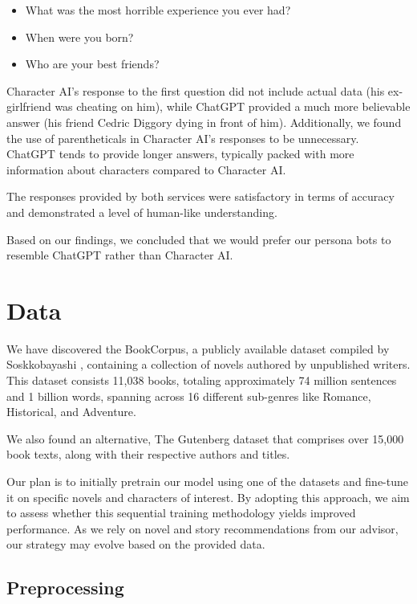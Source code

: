 \documentclass[fleqn,moreauthors,10pt]{ds_report}
\begin{document}
\begin{itemize}
    \item What was the most horrible experience you ever had?
    \item When were you born?
    \item Who are your best friends?
\end{itemize}

Character AI's response to the first question did not include actual data (his ex-girlfriend was cheating on him), while ChatGPT provided a much more believable answer (his friend Cedric Diggory dying in front of him). Additionally, we found the use of parentheticals in Character AI's responses to be unnecessary. ChatGPT tends to provide longer answers, typically packed with more information about characters compared to Character AI.

The responses provided by both services were satisfactory in terms of accuracy and demonstrated a level of human-like understanding.

Based on our findings, we concluded that we would prefer our persona bots to resemble ChatGPT rather than Character AI.

\section*{Data}

We have discovered the BookCorpus, a publicly available dataset compiled by Soskkobayashi \cite{soskkobayashi2018bookcorpus}, containing a collection of novels authored by unpublished writers. This dataset consists 11,038 books, totaling approximately 74 million sentences and 1 billion words, spanning across 16 different sub-genres like Romance, Historical, and Adventure. 

We also found an alternative, The Gutenberg dataset \cite{gutenbergBooks} that comprises over 15,000 book texts, along with their respective authors and titles. 

Our plan is to initially pretrain our model using one of the datasets and fine-tune it on specific novels and characters of interest. By adopting this approach, we aim to assess whether this sequential training methodology yields improved performance. As we rely on novel and story recommendations from our advisor, our strategy may evolve based on the provided data.

\subsection*{Preprocessing}
\end{document}
